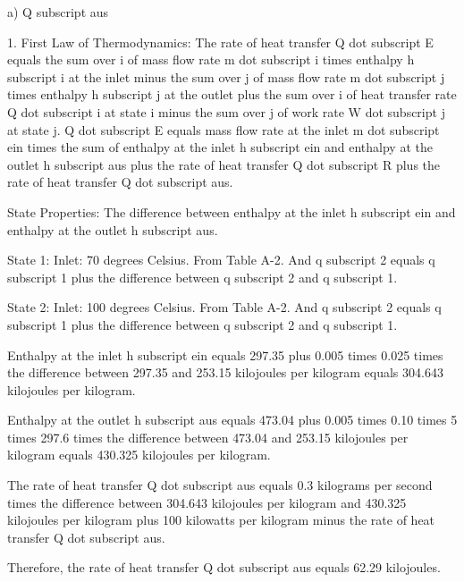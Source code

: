 a) Q subscript aus

1. First Law of Thermodynamics:
The rate of heat transfer Q dot subscript E equals the sum over i of mass flow rate m dot subscript i times enthalpy h subscript i at the inlet minus the sum over j of mass flow rate m dot subscript j times enthalpy h subscript j at the outlet plus the sum over i of heat transfer rate Q dot subscript i at state i minus the sum over j of work rate W dot subscript j at state j.
Q dot subscript E equals mass flow rate at the inlet m dot subscript ein times the sum of enthalpy at the inlet h subscript ein and enthalpy at the outlet h subscript aus plus the rate of heat transfer Q dot subscript R plus the rate of heat transfer Q dot subscript aus.

State Properties:
The difference between enthalpy at the inlet h subscript ein and enthalpy at the outlet h subscript aus.

State 1:
Inlet: 70 degrees Celsius.
From Table A-2.
And q subscript 2 equals q subscript 1 plus the difference between q subscript 2 and q subscript 1.

State 2:
Inlet: 100 degrees Celsius.
From Table A-2.
And q subscript 2 equals q subscript 1 plus the difference between q subscript 2 and q subscript 1.

Enthalpy at the inlet h subscript ein equals 297.35 plus 0.005 times 0.025 times the difference between 297.35 and 253.15 kilojoules per kilogram equals 304.643 kilojoules per kilogram.

Enthalpy at the outlet h subscript aus equals 473.04 plus 0.005 times 0.10 times 5 times 297.6 times the difference between 473.04 and 253.15 kilojoules per kilogram equals 430.325 kilojoules per kilogram.

The rate of heat transfer Q dot subscript aus equals 0.3 kilograms per second times the difference between 304.643 kilojoules per kilogram and 430.325 kilojoules per kilogram plus 100 kilowatts per kilogram minus the rate of heat transfer Q dot subscript aus.

Therefore, the rate of heat transfer Q dot subscript aus equals 62.29 kilojoules.